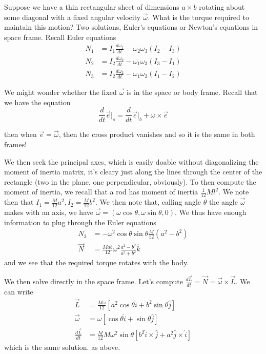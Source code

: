 \documentclass[10pt]{report}
\newcommand{\rd}[2]{\frac{d#1}{d#2}}
\begin{document}
Suppose we have a thin rectangular sheet of dimensions $a\times b$ rotating about some diagonal with a fixed angular velocity $\vec{\omega}$. What is the torque required to maintain this motion? Two solutions, Euler's equations or Newton's equations in space frame. Recall Euler equations
\begin{align*}
    N_1 &= I_1 \rd{\omega_1}{t} - \omega_2 \omega_3 \left( I_2 - I_3 \right)\\
    N_2 &= I_2 \rd{\omega_2}{t} - \omega_1 \omega_3 \left( I_3 - I_1 \right)\\
    N_3 &= I_2 \rd{\omega_2}{t} - \omega_1 \omega_2 \left( I_1 - I_2 \right)
\end{align*}

We might wonder whether the fixed $\vec{\omega}$ is in the space or body frame. Recall that we have the equation
$$\rd{}{t}\vec{e}\Big|_s = \rd{}{t}\vec{e}\Big|_b + \omega \times \vec{e}$$

then when $\vec{e} = \vec{\omega}$, then the cross product vanishes and so it is the same in both frames!

We then seek the principal axes, which is easily doable without diagonalizing the moment of inertia matrix, it's cleary just along the lines through the center of the rectangle (two in the plane, one perpendicular, obviously). To then compute the moment of inertia, we recall that a rod has moment of inertia $\frac{1}{12}Ml^2$. We note then that $I_1 = \frac{M}{12}a^2, I_2 = \frac{M}{12}b^2$. 
We then note that, calling angle $\theta$ the angle $\vec{\omega}$ makes with an axis, we have $\vec{\omega} = (\omega\cos \theta, \omega\sin \theta, 0)$. We thus have enough information to plug through the Euler equations
\begin{align*}
    N_3 &= -\omega^2 \cos \theta\sin\theta \frac{M}{12}\left( a^2 - b^2 \right)\\
    \vec{N} &= \frac{Mab}{12}\omega^2\frac{a^2-b^2}{a^2+b^2}\hat{k}
\end{align*}
and we see that the required torque rotates with the body.

We then solve directly in the space frame. Let's compute $\rd{\vec{L}}{t} = \vec{N} = \vec{\omega}\times \vec{L}$. We can write
\begin{align*}
    \vec{L} &= \frac{M\omega}{12}\left[ a^2\cos\theta \hat{i} + b^2\sin\theta\hat{j} \right]\\
    \vec{\omega} &= \omega\left[ \cos \theta\hat{i} + \sin\theta\hat{j} \right]\\
    \rd{\vec{L}}{t} &= \frac{M}{12}M\omega^2 \sin\theta\left[ b^2\hat{i}\times\hat{j} + a^2\hat{j}\times\hat{i} \right]
\end{align*}
which is the same solution. as above.
\end{document}
